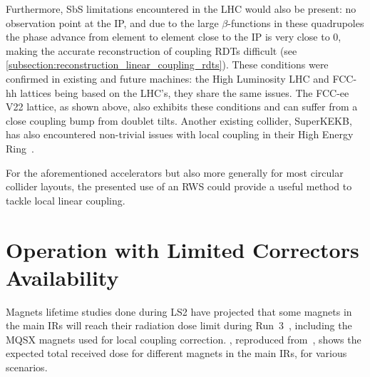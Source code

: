 Furthermore, SbS limitations encountered in the LHC would also be present: no observation point at the IP, and due to the large \(\beta\)-functions in these quadrupoles the phase advance from element to element close to the IP is very close to \num{0}, making the accurate reconstruction of coupling RDTs difficult (see \cref{subsection:reconstruction_linear_coupling_rdts}).
These conditions were confirmed in existing and future machines: the High Luminosity LHC and FCC-hh lattices being based on the LHC's, they share the same issues.
The FCC-ee V\num{22} lattice, as shown above, also exhibits these conditions and can suffer from a close coupling bump from doublet tilts.
Another existing collider, SuperKEKB, has also encountered non-trivial issues with local coupling in their High Energy Ring~\cite{ICFA:Morita:Optics_Corrections_including_IP_Local_Coupling_at_SuperKEKB}.

For the aforementioned accelerators but also more generally for most circular collider layouts, the presented use of an RWS could provide a useful method to tackle local linear coupling.

\section{Operation with Limited Correctors Availability}
\label{section:limited_correctors_availability}

Magnets lifetime studies done during LS\num{2} have projected that some magnets in the main IRs will reach their radiation dose limit during Run~\num{3}~\cite{Evian21:Cerutti:TripletLifetime}, including the MQSX magnets used for local coupling correction.
, reproduced from~\cite{PRES:Cerutti:TripletLifetime_Evian}, shows the expected total received dose for different magnets in the main IRs, for various scenarios.

